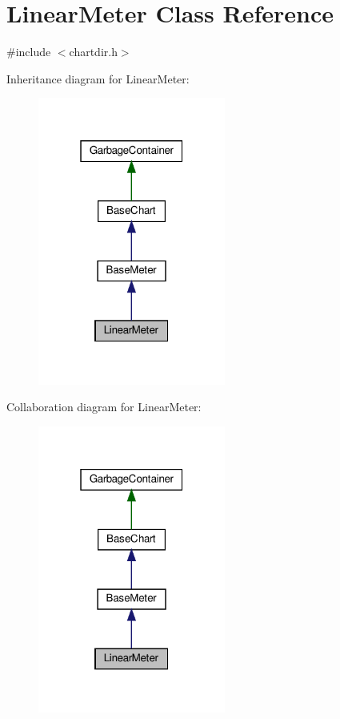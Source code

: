 \hypertarget{class_linear_meter}{}\section{Linear\+Meter Class Reference}
\label{class_linear_meter}


{\ttfamily \#include $<$chartdir.\+h$>$}



Inheritance diagram for Linear\+Meter\+:
\nopagebreak
\begin{figure}[H]
\begin{center}
\leavevmode
\includegraphics[width=175pt]{class_linear_meter__inherit__graph}
\end{center}
\end{figure}


Collaboration diagram for Linear\+Meter\+:
\nopagebreak
\begin{figure}[H]
\begin{center}
\leavevmode
\includegraphics[width=175pt]{class_linear_meter__coll__graph}
\end{center}
\end{figure}
